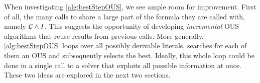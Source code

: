 When investigating \cref{alg:bestStepOUS}, we see ample room for improvement. 
First of all, the many calls to \omus share a large part of the formula they are called with, namely $\mathcal{C}  \land I$.
This suggests the opportunity of developing \emph{incremental} OUS algorithms that reuse results from previous calls. 
More generally, \cref{alg:bestStepOUS} loops over all possibly derivable  literals, searches for each of them an OUS and subsequently selects the best. %
Ideally, this whole loop could be done in a single call to a solver that exploits all possible information at once. 
These two ideas are explored in the next two sections.
